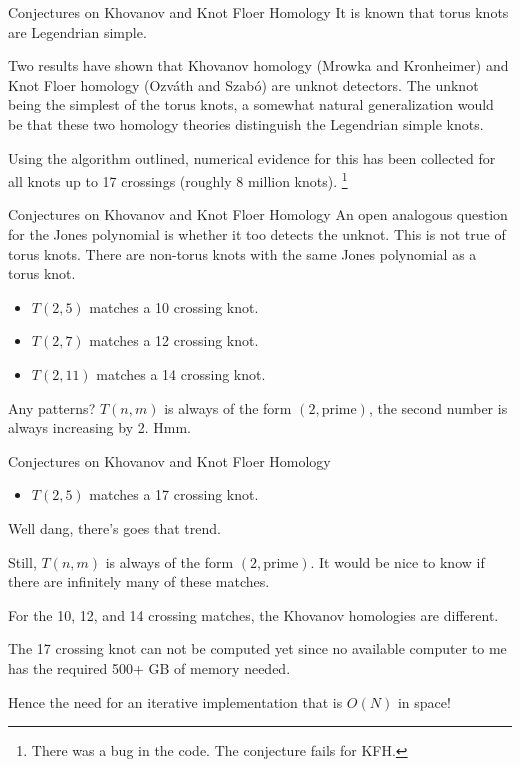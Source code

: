 \documentclass{beamer}
\begin{document}
    \begin{frame}{Conjectures on Khovanov and Knot Floer Homology}
        It is known that torus knots are Legendrian simple.
        \par\hfill\par
        Two results have shown that Khovanov homology (Mrowka and Kronheimer)
        and Knot Floer homology (Ozv\'{a}th and Szab\'{o}) are unknot detectors.
        The unknot being the simplest of the torus knots, a somewhat natural
        generalization would be that these two homology theories
        distinguish the Legendrian simple knots.
        \par\hfill\par
        Using the algorithm outlined, numerical evidence for this has been
        collected for all knots up to 17 crossings (roughly 8 million knots).%
        \footnote{\textbf{\color{red}{Correction:}} There was a bug in the
                  code. The conjecture fails for KFH.}
    \end{frame}
    \begin{frame}{Conjectures on Khovanov and Knot Floer Homology}
        An open analogous question for the Jones polynomial is whether it too
        detects the unknot. This is not true of torus knots. There are
        non-torus knots with the same Jones polynomial as a torus knot.
        \begin{itemize}
            \item $T(2,5)$ matches a 10 crossing knot.
            \item $T(2,7)$ matches a 12 crossing knot.
            \item $T(2,11)$ matches a 14 crossing knot.
        \end{itemize}
        Any patterns? $T(n,m)$ is always of the form $(2,\text{prime})$,
        the second number is always increasing by 2. Hmm.
    \end{frame}
    \begin{frame}{Conjectures on Khovanov and Knot Floer Homology}
        \begin{itemize}
            \item $T(2,5)$ matches a 17 crossing knot.
        \end{itemize}
        Well dang, there's goes that trend.
        \par\hfill\par
        Still, $T(n,m)$ is always of the form $(2,\text{prime})$. It would
        be nice to know if there are infinitely many of these matches.
        \par\hfill\par
        For the 10, 12, and 14
        crossing matches, the Khovanov homologies are different.
        \par\hfill\par
        The 17 crossing knot can not be computed yet since no
        available computer to me has the required 500+ GB of memory needed.
        \par\hfill\par
        Hence the need for an iterative implementation that is $O(N)$ in space!
    \end{frame}
\end{document}
